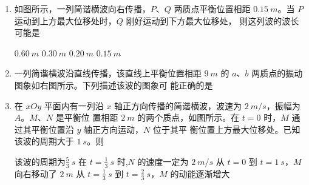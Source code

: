 

\begin{enumerate}
	\item
{}
如图所示，一列简谐横波向右传播，$ P $、$ Q $ 两质点平衡位置相距 $ 0.15 \ m $。当
$ P $ 运动到上方最大位移处时，$ Q $ 刚好运动到下方最大位移处，
则这列波的波长可能是  
\begin{figure}[h!]
	\centering
	
\end{figure}


\fourchoices
{$ 0.60 \ m $}
{$ 0.30 \ m $}
{$ 0.20 \ m $}
{$ 0.15 \ m $}


\item 
{}
一列简谐横波沿直线传播，该直线上平衡位置相距 $ 9 \ m $ 的
$ a $、$ b $ 两质点的振动图象如右图所示。下列描述该波的图象可
能正确的是  
\begin{figure}[h!]
	\centering
	
\end{figure}

\pfourchoices
{}
{}
{}
{}


\item 
{}
在 $ xOy $ 平面内有一列沿 $ x $ 轴正方向传播的简谐横波，波速为 $ 2 \ m /s $，振幅为 $ A $。$ M $、$ N $ 是平衡位
置相距 $ 2 \ m $ 的两个质点，如图所示。在 $ t=0 $ 时，$ M $ 通过其平衡位置沿 $ y $ 轴正方向运动，$ N $ 位于其平
衡位置上方最大位移处。已知该波的周期大于 $ 1 \ s $。则  
\begin{figure}[h!]
	\centering
	
\end{figure}

\fourchoices
{该波的周期为$ \frac{ 5 }{ 3 } \ s $}
{在 $ t= \frac{ 1 }{ 3 } \ s $ 时,$ N $ 的速度一定为 $ 2 \ m /s $}
{从 $ t=0 $ 到 $ t=1 \ s $，$ M $ 向右移动了 $ 2 \ m $}
{从 $ t= \frac{ 1 }{ 3 } \ s $ 到 $ t= \frac{ 2 }{ 3 } \ s $，$ M $ 的动能逐渐增大}


\end{enumerate}
